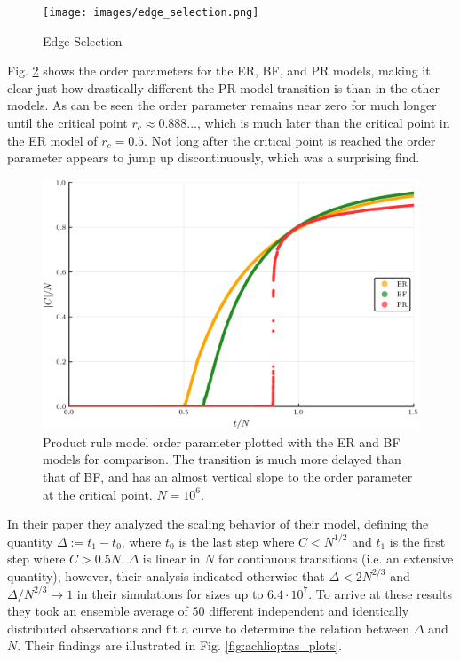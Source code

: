 \begin{figure}[H]
	\centering
	\texttt{[image: images/edge\_selection.png]}
	\caption{Edge Selection}
	\label{fig:edge_selection}
\end{figure}

Fig. \ref{fig:ER_BF_PR_transition} shows the order parameters for the ER, BF, and PR models, making it clear just how drastically different the PR model transition is than in the other models.
As can be seen the order parameter remains near zero for much longer until the critical point $r_c \approx 0.888...$, which is much later than the critical point in the ER model of $r_c = 0.5$.
Not long after the critical point is reached the order parameter appears to jump up discontinuously, which was a surprising find.

\begin{figure}[H]
	\centering
	\includegraphics[width=350pt]{images/Network_ER_BF_PR_1e6_order_param.png}
	\caption{Product rule model order parameter plotted with the ER and BF models for comparison. The transition is much more delayed than that of BF, and has an almost vertical slope to the order parameter at the critical point. $N = 10^6$.}
	\label{fig:ER_BF_PR_transition}
\end{figure}

In their paper they analyzed the scaling behavior of their model, defining the quantity $\Delta := t_1 - t_0$, where $t_0$ is the last step where $C < N^{1/2}$ and $t_1$ is the first step where $C > 0.5N$.
$\Delta$ is linear in $N$ for continuous transitions (i.e. an extensive quantity), however, their analysis indicated otherwise that $\Delta < 2N^{2/3}$ and $\Delta / N^{2/3} \rightarrow 1$ in their simulations for sizes up to $6.4 \cdot 10^7$.
To arrive at these results they took an ensemble average of 50 different independent and identically distributed observations and fit a curve to determine the relation between $\Delta$ and $N$.
Their findings are illustrated in Fig. \ref{fig:achlioptas_plots}.

